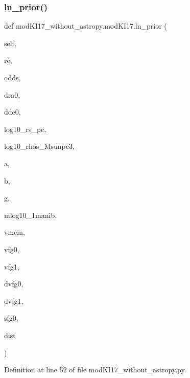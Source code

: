 \subsubsection{\texorpdfstring{ln\+\_\+prior()}{ln\_prior()}}
{\footnotesize\ttfamily def mod\+K\+I17\+\_\+without\+\_\+astropy.\+mod\+K\+I17.\+ln\+\_\+prior (\begin{DoxyParamCaption}\item[{}]{self,  }\item[{}]{re,  }\item[{}]{odds,  }\item[{}]{dra0,  }\item[{}]{dde0,  }\item[{}]{log10\+\_\+rs\+\_\+pc,  }\item[{}]{log10\+\_\+rhos\+\_\+\+Msunpc3,  }\item[{}]{a,  }\item[{}]{b,  }\item[{}]{g,  }\item[{}]{mlog10\+\_\+1manib,  }\item[{}]{vmem,  }\item[{}]{vfg0,  }\item[{}]{vfg1,  }\item[{}]{dvfg0,  }\item[{}]{dvfg1,  }\item[{}]{sfg0,  }\item[{}]{dist }\end{DoxyParamCaption})}



Definition at line 52 of file mod\+K\+I17\+\_\+without\+\_\+astropy.\+py.



